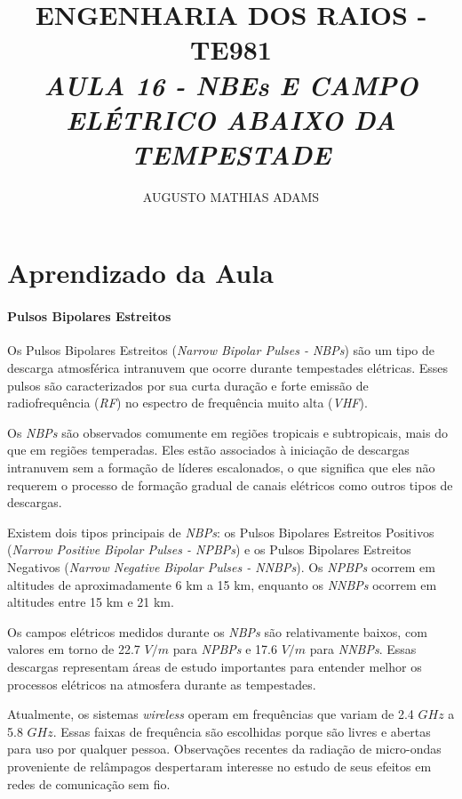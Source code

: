 \documentclass[a4paper, 12pt, onecolumn,singlespacing]{article}
\title{\normalsize{ENGENHARIA DOS RAIOS - TE981}\\ \huge{\textbf\textit{{AULA 16 - NBEs E CAMPO ELÉTRICO ABAIXO DA TEMPESTADE}}\\}}
\author{\small{AUGUSTO MATHIAS ADAMS}}
\begin{document}
	
	\maketitle
	
	\section{Aprendizado da Aula}
	
	\paragraph{Pulsos Bipolares Estreitos} Os Pulsos Bipolares Estreitos (\textit{Narrow Bipolar Pulses - NBPs}) são um tipo de descarga atmosférica intranuvem que ocorre durante tempestades elétricas. Esses pulsos são caracterizados por sua curta duração e forte emissão de radiofrequência (\textit{RF}) no espectro de frequência muito alta (\textit{VHF}).
	
	Os \textit{NBPs} são observados comumente em regiões tropicais e subtropicais, mais do que em regiões temperadas. Eles estão associados à iniciação de descargas intranuvem sem a formação de líderes escalonados, o que significa que eles não requerem o processo de formação gradual de canais elétricos como outros tipos de descargas.
	
	Existem dois tipos principais de \textit{NBPs}: os Pulsos Bipolares Estreitos Positivos (\textit{Narrow Positive Bipolar Pulses - NPBPs}) e os Pulsos Bipolares Estreitos Negativos (\textit{Narrow Negative Bipolar Pulses - NNBPs}). Os \textit{NPBPs} ocorrem em altitudes de aproximadamente 6 km a 15 km, enquanto os \textit{NNBPs} ocorrem em altitudes entre 15 km e 21 km.
	
	Os campos elétricos medidos durante os \textit{NBPs} são relativamente baixos, com valores em torno de 22.7 $V/m$ para \textit{NPBPs} e 17.6 $V/m$ para \textit{NNBPs}. Essas descargas representam áreas de estudo importantes para entender melhor os processos elétricos na atmosfera durante as tempestades.
	
	Atualmente, os sistemas \textit{wireless} operam em frequências que variam de 2.4 $GHz$ a 5.8 $GHz$. Essas faixas de frequência são escolhidas porque são livres e abertas para uso por qualquer pessoa. Observações recentes da radiação de micro-ondas proveniente de relâmpagos despertaram interesse no estudo de seus efeitos em redes de comunicação sem fio.
	
\end{document}
